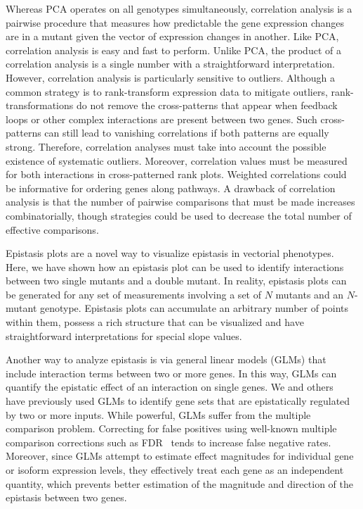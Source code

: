 \documentclass[9pt,twocolumn,twoside]{pnas-new}
\begin{document}
Whereas PCA operates on all genotypes simultaneously, correlation analysis is a
pairwise procedure that measures how predictable the gene
expression changes are in a mutant given the vector of expression changes in
another. Like PCA, correlation analysis is easy and fast to perform. Unlike PCA,
the product of a correlation analysis is a single number with a straightforward
interpretation. However, correlation analysis is particularly sensitive to outliers.
Although a common strategy is to rank-transform expression data to mitigate
outliers, rank-transformations do not remove the cross-patterns that appear when
feedback loops or other complex interactions are present between two genes.
Such cross-patterns can still lead to vanishing correlations if both patterns are
equally strong. Therefore, correlation analyses must take into account the possible
existence of systematic outliers. Moreover, correlation values must be measured
for both interactions in cross-patterned rank plots. Weighted correlations could
be informative for ordering genes along pathways.
A drawback of correlation
analysis is that the number of pairwise comparisons that must be made increases
combinatorially, though strategies could be used to decrease the total number of
effective comparisons.

Epistasis plots are a novel way to visualize epistasis in vectorial phenotypes.
Here, we have shown how an epistasis plot can be used to identify interactions
between two single mutants and a double mutant. In reality, epistasis plots
can be generated for any set of measurements involving a set of $N$ mutants and
an $N$-mutant genotype. Epistasis plots can accumulate an arbitrary number of
points within them, possess a rich structure that can be visualized and have
straightforward interpretations for special slope values.

Another way to analyze epistasis is via general linear models (GLMs) that include
interaction terms between two or more genes. In this way, GLMs can quantify
the epistatic effect of an interaction on single genes. We and
others~\cite{Dixit2016,Angeles-Albores2016a} have previously used GLMs to identify
gene sets that are epistatically regulated by two or more inputs. While powerful,
GLMs suffer from the multiple comparison problem. Correcting for false positives
using well-known multiple comparison corrections such as FDR~\cite{Storey2003}
tends to increase false negative rates.  Moreover, since GLMs attempt to estimate
effect magnitudes for individual gene or isoform expression levels, they
effectively treat each gene as an independent quantity, which prevents better
estimation of the magnitude and direction of the epistasis between two genes.
\end{document}
